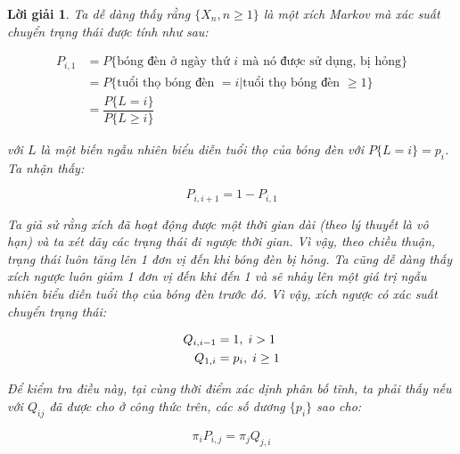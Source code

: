 \documentclass[14pt, a4paper]{article}
\numberwithin{equation}{section}
\numberwithin{figure}{section}
\theoremstyle{sltheorem}
\theoremstyle{soltheorem}
\newtheorem*{loigiai}{Lời giải}
\numberwithin{dl}{section}
\numberwithin{md}{section}
\numberwithin{vd}{section}
\begin{document}
    \begin{loigiai}
        Ta dễ dàng thấy rằng $\lbrace X_n, n \geq 1 \rbrace$ là một xích Markov mà xác suất chuyển trạng thái được tính như sau:

        \begin{equation*}
            \begin{aligned}
                P_{i,1} &= P \lbrace \text{bóng đèn ở ngày thứ } i \text{ mà nó được sử dụng, bị hỏng} \rbrace \\
                &= P \lbrace \text{tuổi thọ bóng đèn } = i \vert \text{tuổi thọ bóng đèn } \geq 1 \rbrace \\
                &= \dfrac{P \lbrace L = i \rbrace}{P \lbrace L \geq i \rbrace}
            \end{aligned}
        \end{equation*}

        với $L$ là một biến ngẫu nhiên biểu diễn tuổi thọ của bóng đèn với $P \lbrace L = i \rbrace = p_i$. Ta nhận thấy:

        \begin{equation*}
            P_{i, i+1}=1 - P _{i, 1}
        \end{equation*}

        Ta giả sử rằng xích đã hoạt động được một thời gian dài (theo lý thuyết là vô hạn) và ta xét dãy các trạng thái đi ngược thời gian.
        Vì vậy, theo chiều thuận, trạng thái luôn tăng lên 1 đơn vị đến khi bóng đèn bị hỏng.
        Ta cũng dễ dàng thấy xích ngược luôn giảm 1 đơn vị đến khi đến 1 và sẽ nhảy lên một giá trị ngẫu nhiên biểu diễn tuổi thọ của bóng đèn trước đó.
        Vì vậy, xích ngược có xác suất chuyển trạng thái:

        \begin{equation*}
            \begin{aligned}
                Q_{i, i-1} &= 1, \thickspace i > 1 \\
                Q_{1, i} &= p_i, \thickspace i \geq 1
            \end{aligned}
        \end{equation*}

        Để kiểm tra điều này, tại cùng thời điểm xác dịnh phân bố tĩnh, ta phải thấy nếu với $Q_{ij}$ đã được cho ở công thức trên, các số dương $\lbrace p_i \rbrace$ sao cho:

        \begin{equation*}
            \pi_i P_{i, j} = \pi_j Q_{j, i}
        \end{equation*}


\end{loigiai}
\end{document}
